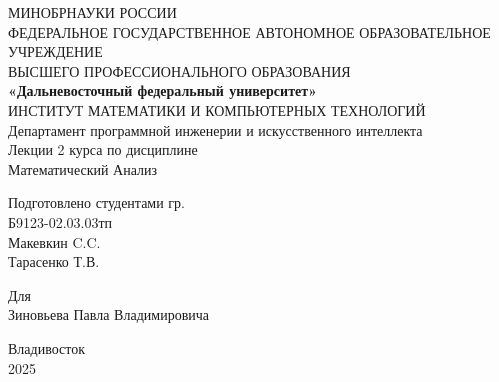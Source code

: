 \documentclass[12pt]{article}
\begin{document}
    \justifying
    \begin{titlepage}
        \begin{center}
            \hfill \break
            \large{МИНОБРНАУКИ РОССИИ}\\
            \footnotesize{ФЕДЕРАЛЬНОЕ ГОСУДАРСТВЕННОЕ АВТОНОМНОЕ ОБРАЗОВАТЕЛЬНОЕ УЧРЕЖДЕНИЕ}\\ 
            \footnotesize{ВЫСШЕГО ПРОФЕССИОНАЛЬНОГО ОБРАЗОВАНИЯ}\\
            \small{\textbf{«Дальневосточный федеральный университет»}}\\
            \hfill \break
            \normalsize{ИНСТИТУТ МАТЕМАТИКИ И КОМПЬЮТЕРНЫХ ТЕХНОЛОГИЙ}\\
             \hfill \break
            \normalsize{Департамент программной инженерии и искусственного интеллекта}\\
            \hfill\break
            \hfill \break
            \hfill \break
            \hfill \break
            \large{Лекции 2 курса по дисциплине}\\
            \large{Математический Анализ}\\
            \hfill \break
            \hfill \break
            \hfill \break
            \begin{flushright}
              Подготовлено студентами гр.\\
              Б9123-02.03.03тп\\
              Макевкин C.C.\\
              Тарасенко Т.В.\\
              \hfill \break
            \end{flushright}
            \begin{center}
                Для\\
              Зиновьева Павла Владимировича
            \end{center}
            \hfill \break
            
            \hfill \break
            
            \hfill \break
            \hfill \break
            \end{center}
             
            \hfill \break
             
            \normalsize{ 
            
            }
            \begin{center} Владивосток \\ 2025 \end{center}
            \thispagestyle{empty}
    \end{titlepage}
    \pagebreak
    \tableofcontents
    \pagebreak
\end{document}
